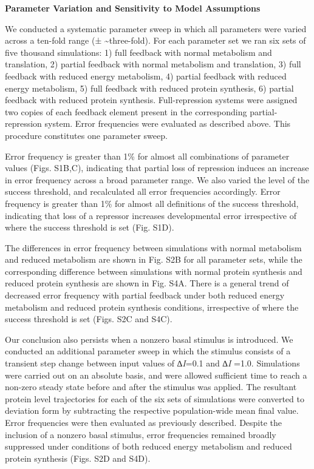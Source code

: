 \textbf{Parameter Variation and Sensitivity to Model Assumptions}

We conducted a systematic parameter sweep in which all parameters were varied across a ten-fold range (± \textasciitilde{}three-fold). For each parameter set we ran six sets of five thousand simulations: 1) full feedback with normal metabolism and translation, 2) partial feedback with normal metabolism and translation, 3) full feedback with reduced energy metabolism, 4) partial feedback with reduced energy metabolism, 5) full feedback with reduced protein synthesis, 6) partial feedback with reduced protein synthesis. Full-repression systems were assigned two copies of each feedback element present in the corresponding partial-repression system. Error frequencies were evaluated as described above. This procedure constitutes one parameter sweep.

Error frequency is greater than 1\% for almost all combinations of parameter values (Figs. S1B,C), indicating that partial loss of repression induces an increase in error frequency across a broad parameter range. We also varied the level of the success threshold, and recalculated all error frequencies accordingly. Error frequency is greater than 1\% for almost all definitions of the success threshold, indicating that loss of a repressor increases developmental error irrespective of where the success threshold is set (Fig. S1D).

The differences in error frequency between simulations with normal metabolism and reduced metabolism are shown in Fig. S2B for all parameter sets, while the corresponding difference between simulations with normal protein synthesis and reduced protein synthesis are shown in Fig. S4A. There is a general trend of decreased error frequency with partial feedback under both reduced energy metabolism and reduced protein synthesis conditions, irrespective of where the success threshold is set (Figs. S2C and S4C).

Our conclusion also persists when a nonzero basal stimulus is introduced. We conducted an additional parameter sweep in which the stimulus consists of a transient step change between input values of ∆\emph{I}=0.1 and ∆\emph{I} =1.0. Simulations were carried out on an absolute basis, and were allowed sufficient time to reach a non-zero steady state before and after the stimulus was applied. The resultant protein level trajectories for each of the six sets of simulations were converted to deviation form by subtracting the respective population-wide mean final value. Error frequencies were then evaluated as previously described. Despite the inclusion of a nonzero basal stimulus, error frequencies remained broadly suppressed under conditions of both reduced energy metabolism and reduced protein synthesis (Figs. S2D and S4D).

